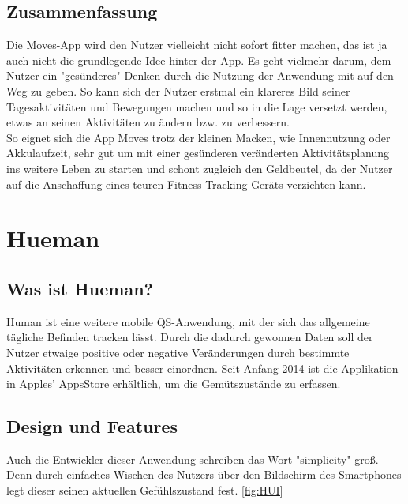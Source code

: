 \subsection{Zusammenfassung}
\label{ch:Apps:sec:Moves:subsec:VERDICT} 

Die Moves-App wird den Nutzer vielleicht nicht sofort fitter machen, das ist ja auch nicht die grundlegende Idee hinter der App. 
Es geht vielmehr darum, dem Nutzer ein "gesünderes" Denken durch die Nutzung der Anwendung mit auf den Weg zu geben. 
So kann sich der Nutzer erstmal ein klareres Bild seiner Tagesaktivitäten und Bewegungen machen und so in die Lage versetzt werden, etwas an seinen Aktivitäten zu ändern bzw. zu verbessern.
\\
So eignet sich die App Moves trotz der kleinen Macken, wie Innennutzung oder Akkulaufzeit, sehr gut um mit einer gesünderen veränderten Aktivitätsplanung ins weitere Leben zu starten und schont zugleich den Geldbeutel, da der Nutzer auf die Anschaffung eines teuren Fitness-Tracking-Geräts verzichten kann.

\section{Hueman}
\label{ch:Apps:sec:Hueman}

\subsection{Was ist Hueman?}
\label{ch:Apps:sec:Hueman:subsec:WIH}

Human ist eine weitere mobile QS-Anwendung, mit der sich das allgemeine tägliche Befinden tracken lässt. 
Durch die dadurch gewonnen Daten soll der Nutzer etwaige positive oder negative Veränderungen durch bestimmte Aktivitäten erkennen und besser einordnen.
Seit Anfang 2014 ist die Applikation in Apples' AppsStore erhältlich, um die Gemütszustände zu erfassen.


\subsection{Design und Features}
\label{ch:Apps:sec:Hueman:subsec:DuFe}

Auch die Entwickler dieser Anwendung schreiben das Wort "simplicity" groß. 
Denn durch einfaches Wischen des Nutzers über den Bildschirm des Smartphones legt dieser seinen aktuellen Gefühlszustand fest.
\ref{fig:HUI}

